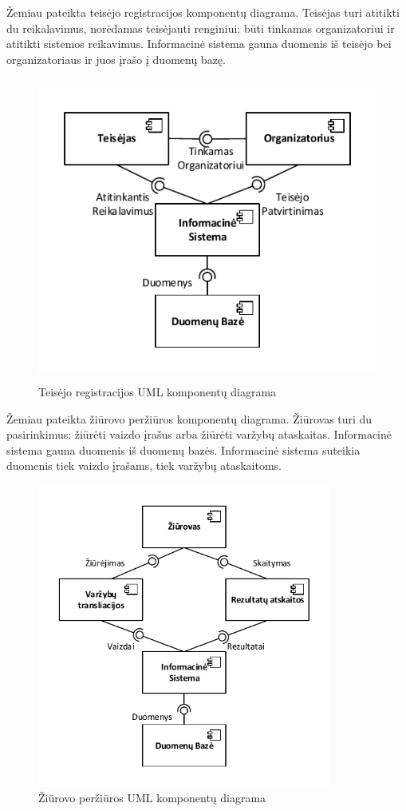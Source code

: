 \documentclass{VUMIFPSkursinis}
\begin{document}
		Žemiau pateikta teisėjo registracijos komponentų diagrama. 
		Teisėjas turi atitikti du reikalavimus, norėdamas teisėjauti renginiui: būti tinkamas organizatoriui ir atitikti sistemos reikavimus. 
		Informacinė sistema gauna duomenis iš teisėjo bei organizatoriaus ir juos įrašo į duomenų bazę. 
		
		\begin{figure}[H]
			\centering
			\includegraphics[width=\textwidth, height=10cm, keepaspectratio]{img/KomponentuDiagrama3}
			\caption{Teisėjo registracijos UML komponentų diagrama}
			\label{fig:TeisejoRegistracijosUMLKomponentuDiagrama}
		\end{figure}
		
		Žemiau pateikta žiūrovo peržiūros komponentų diagrama. 
		Žiūrovas turi du pasirinkimus: žiūrėti vaizdo įrašus arba žiūrėti varžybų ataskaitas. 
		Informacinė sistema gauna duomenis iš duomenų bazės. 
		Informacinė sistema suteikia duomenis tiek vaizdo įrašams, tiek varžybų ataskaitoms.
		
		\begin{figure}[H]
			\centering
			\includegraphics[width=\textwidth, height=10cm, keepaspectratio]{img/KomponentuDiagrama4}
			\caption{Žiūrovo peržiūros UML komponentų diagrama}
			\label{fig:ZiurovoPerziurosUMLKomponentuDiagrama}
		\end{figure}
		
\end{document}
